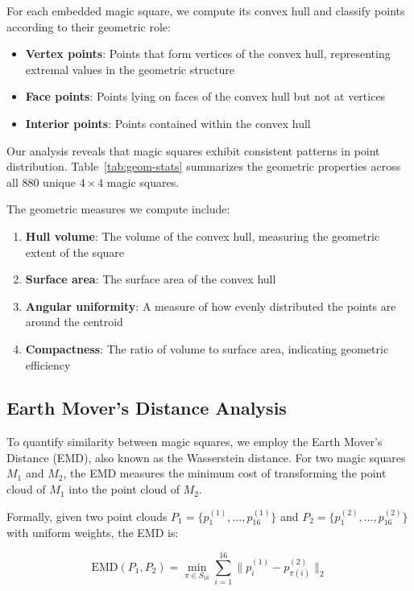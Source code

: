 For each embedded magic square, we compute its convex hull and classify points according to their geometric role:

\begin{itemize}
    \item \textbf{Vertex points}: Points that form vertices of the convex hull, representing extremal values in the geometric structure
    \item \textbf{Face points}: Points lying on faces of the convex hull but not at vertices
    \item \textbf{Interior points}: Points contained within the convex hull
\end{itemize}

Our analysis reveals that magic squares exhibit consistent patterns in point distribution. Table~\ref{tab:geom-stats} summarizes the geometric properties across all 880 unique $4 \times 4$ magic squares.



The geometric measures we compute include:
\begin{enumerate}
    \item \textbf{Hull volume}: The volume of the convex hull, measuring the geometric extent of the square
    \item \textbf{Surface area}: The surface area of the convex hull
    \item \textbf{Angular uniformity}: A measure of how evenly distributed the points are around the centroid
    \item \textbf{Compactness}: The ratio of volume to surface area, indicating geometric efficiency
\end{enumerate}

\subsection{Earth Mover's Distance Analysis}

To quantify similarity between magic squares, we employ the Earth Mover's Distance (EMD), also known as the Wasserstein distance. For two magic squares $M_1$ and $M_2$, the EMD measures the minimum cost of transforming the point cloud of $M_1$ into the point cloud of $M_2$.

Formally, given two point clouds $P_1 = \{p_1^{(1)}, \ldots, p_{16}^{(1)}\}$ and $P_2 = \{p_1^{(2)}, \ldots, p_{16}^{(2)}\}$ with uniform weights, the EMD is:

\[
\text{EMD}(P_1, P_2) = \min_{\pi \in S_{16}} \sum_{i=1}^{16} \|p_i^{(1)} - p_{\pi(i)}^{(2)}\|_2
\]

